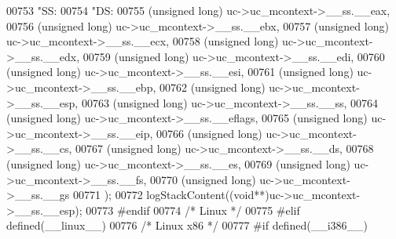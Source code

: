 \begin{DoxyCode}
{{{{{{{{{{{{{{{{{{{{{{{{{{{{{{{{{{{{{{{{{{{{{{{{{{{00753     \textcolor{stringliteral}{"SS:%
00754     \textcolor{stringliteral}{"DS:%
00755         (\textcolor{keywordtype}{unsigned} \textcolor{keywordtype}{long}) uc->uc\_mcontext->\_\_ss.\_\_eax,
00756         (\textcolor{keywordtype}{unsigned} \textcolor{keywordtype}{long}) uc->uc\_mcontext->\_\_ss.\_\_ebx,
00757         (\textcolor{keywordtype}{unsigned} \textcolor{keywordtype}{long}) uc->uc\_mcontext->\_\_ss.\_\_ecx,
00758         (\textcolor{keywordtype}{unsigned} \textcolor{keywordtype}{long}) uc->uc\_mcontext->\_\_ss.\_\_edx,
00759         (\textcolor{keywordtype}{unsigned} \textcolor{keywordtype}{long}) uc->uc\_mcontext->\_\_ss.\_\_edi,
00760         (\textcolor{keywordtype}{unsigned} \textcolor{keywordtype}{long}) uc->uc\_mcontext->\_\_ss.\_\_esi,
00761         (\textcolor{keywordtype}{unsigned} \textcolor{keywordtype}{long}) uc->uc\_mcontext->\_\_ss.\_\_ebp,
00762         (\textcolor{keywordtype}{unsigned} \textcolor{keywordtype}{long}) uc->uc\_mcontext->\_\_ss.\_\_esp,
00763         (\textcolor{keywordtype}{unsigned} \textcolor{keywordtype}{long}) uc->uc\_mcontext->\_\_ss.\_\_ss,
00764         (\textcolor{keywordtype}{unsigned} \textcolor{keywordtype}{long}) uc->uc\_mcontext->\_\_ss.\_\_eflags,
00765         (\textcolor{keywordtype}{unsigned} \textcolor{keywordtype}{long}) uc->uc\_mcontext->\_\_ss.\_\_eip,
00766         (\textcolor{keywordtype}{unsigned} \textcolor{keywordtype}{long}) uc->uc\_mcontext->\_\_ss.\_\_cs,
00767         (\textcolor{keywordtype}{unsigned} \textcolor{keywordtype}{long}) uc->uc\_mcontext->\_\_ss.\_\_ds,
00768         (\textcolor{keywordtype}{unsigned} \textcolor{keywordtype}{long}) uc->uc\_mcontext->\_\_ss.\_\_es,
00769         (\textcolor{keywordtype}{unsigned} \textcolor{keywordtype}{long}) uc->uc\_mcontext->\_\_ss.\_\_fs,
00770         (\textcolor{keywordtype}{unsigned} \textcolor{keywordtype}{long}) uc->uc\_mcontext->\_\_ss.\_\_gs
00771     );
00772     logStackContent((\textcolor{keywordtype}{void}**)uc->uc\_mcontext->\_\_ss.\_\_esp);
00773     \textcolor{preprocessor}{#}\textcolor{preprocessor}{endif}
00774 \textcolor{comment}{/* Linux */}
00775 \textcolor{preprocessor}{#}\textcolor{preprocessor}{elif} \textcolor{preprocessor}{defined}\textcolor{preprocessor}{(}\_\_linux\_\_\textcolor{preprocessor}{)}
00776     \textcolor{comment}{/* Linux x86 */}
00777     \textcolor{preprocessor}{#}\textcolor{preprocessor}{if} \textcolor{preprocessor}{defined}\textcolor{preprocessor}{(}\textcolor{preprocessor}{\_\_i386\_\_}\textcolor{preprocessor}{)}
}}}}}}}}}}}}}}}}}}}}}}}}}}}}}}}}}}}}}}}}}}}}}}}}}}}}}
\end{DoxyCode}
